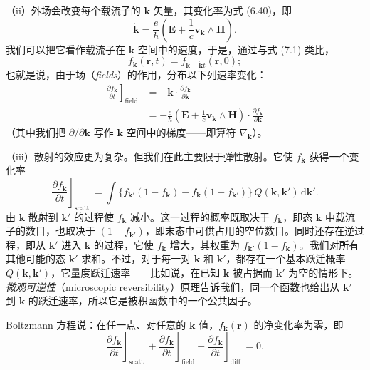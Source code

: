 （ii）外场会改变每个载流子的 $\mathbf{k}$ 矢量，其变化率为式 (6.40)，即
\begin{equation*}
\dot{\mathbf{k}}=\frac{e}{\hbar}\left(\mathbf{E}+\frac{1}{c}\mathbf{v}_{\mathbf{k}}\wedge\mathbf{H}\right).\tag{7.3}
\end{equation*}
我们可以把它看作载流子在 $\mathbf{k}$ 空间中的速度，于是，通过与式 (7.1) 类比，
\begin{equation*}
f_{\mathbf{k}}(\mathbf{r},t)=f_{\mathbf{k}-\dot{\mathbf{k}}t}(\mathbf{r},0);\tag{7.4}
\end{equation*}
也就是说，由于场（\emph{fields}）的作用，分布以下列速率变化：
\begin{align*}
\left.\frac{\partial f_{\mathbf{k}}}{\partial t}\right]_{\text{field}}
&=-\dot{\mathbf{k}}\cdot\frac{\partial f_{\mathbf{k}}}{\partial\mathbf{k}}\\
&=-\frac{e}{\hbar}\left(\mathbf{E}+\frac{1}{c}\mathbf{v}_{\mathbf{k}}\wedge\mathbf{H}\right)\cdot\frac{\partial f_{\mathbf{k}}}{\partial\mathbf{k}}\tag{7.5}
\end{align*}
（其中我们把 $\partial/\partial\mathbf{k}$ 写作 $\mathbf{k}$ 空间中的梯度——即算符 $\nabla_{\mathbf{k}}$）。

（iii）散射的效应更为复杂。但我们在此主要限于弹性散射。它使 $f_{\mathbf{k}}$ 获得一个变化率
\begin{equation*}
\left.\frac{\partial f_{\mathbf{k}}}{\partial t}\right]_{\text{scatt.}}
=\int\{f_{\mathbf{k}'}(1-f_{\mathbf{k}})-f_{\mathbf{k}}(1-f_{\mathbf{k}'})\}\,Q(\mathbf{k},\mathbf{k}')\,\mathrm{d}\mathbf{k}'.\tag{7.6}
\end{equation*}
由 $\mathbf{k}$ 散射到 $\mathbf{k}'$ 的过程使 $f_{\mathbf{k}}$ 减小。这一过程的概率既取决于 $f_{\mathbf{k}}$，即态 $\mathbf{k}$ 中载流子的数目，也取决于 $(1-f_{\mathbf{k}'})$，即末态中可供占用的空位数目。同时还存在逆过程，即从 $\mathbf{k}'$ 进入 $\mathbf{k}$ 的过程，它使 $f_{\mathbf{k}}$ 增大，其权重为 $f_{\mathbf{k}'}(1-f_{\mathbf{k}})$。我们对所有其他可能的态 $\mathbf{k}'$ 求和。不过，对于每一对 $\mathbf{k}$ 和 $\mathbf{k}'$，都存在一个基本跃迁概率 $Q(\mathbf{k},\mathbf{k}')$，它量度跃迁速率——比如说，在已知 $\mathbf{k}$ 被占据而 $\mathbf{k}'$ 为空的情形下。\emph{微观可逆性}（microscopic reversibility）原理告诉我们，同一个函数也给出从 $\mathbf{k}'$ 到 $\mathbf{k}$ 的跃迁速率，所以它是被积函数中的一个公共因子。

Boltzmann 方程说：在任一点、对任意的 $\mathbf{k}$ 值，$f_{\mathbf{k}}(\mathbf{r})$ 的净变化率为零，即
\begin{equation*}
\left.\frac{\partial f_{\mathbf{k}}}{\partial t}\right]_{\text{scatt.}}
+\left.\frac{\partial f_{\mathbf{k}}}{\partial t}\right]_{\text{field}}
+\left.\frac{\partial f_{\mathbf{k}}}{\partial t}\right]_{\text{diff.}}=0.\tag{7.7}
\end{equation*}

